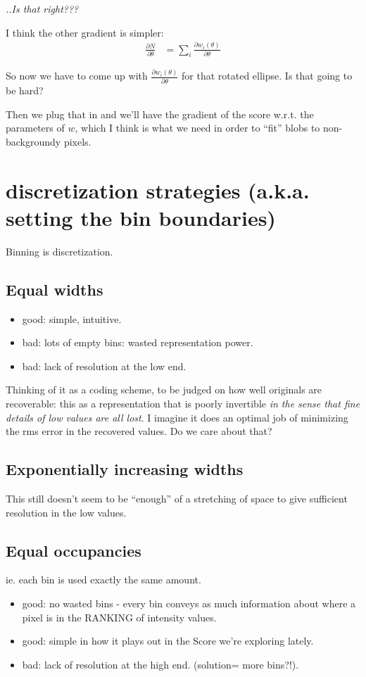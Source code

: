 \documentclass[11pt]{article}
\begin{document}
{\em ..Is that right???}

I think the other gradient is simpler:
\begin{align}
\frac{\partial N}{\partial \theta} &= \sum_i \frac{\partial w_i(\theta)}{\partial \theta}
\end{align}


So now we have to come up with $\frac{\partial w_i(\theta)}{\partial
  \theta}$ for that rotated ellipse. Is that going to be hard?

Then we plug that in and we'll have the gradient of the score
w.r.t. the parameters of $w$, which I think is what we need in order to ``fit'' blobs to non-backgroundy pixels.




\section{discretization strategies (a.k.a. setting the bin boundaries)}
Binning is discretization.

\subsection{Equal widths}
\begin{itemize}
\item good: simple, intuitive.
\item bad: lots of empty bins: wasted representation power.
\item bad: lack of resolution at the low end. 
\end{itemize}

Thinking of it as a coding scheme, to be judged on how well originals
are recoverable: this as a representation that is poorly invertible
{\it in the sense that fine details of low values are all
  lost}. I imagine it does an optimal job of minimizing the rms error in
the recovered values. Do we care about that?

\subsection{Exponentially increasing widths}
This still doesn't seem to be ``enough'' of a stretching of space to
give sufficient resolution in the low values.

\subsection{Equal occupancies}
ie. each bin is used exactly the same amount.
\begin{itemize}
\item good: no wasted bins - every bin conveys as much information about where a pixel is in the RANKING of intensity values.
\item good: simple in how it plays out in the Score we're exploring lately.
\item bad: lack of resolution at the high end. (solution= more bins?!).
\end{itemize}
\end{document}
